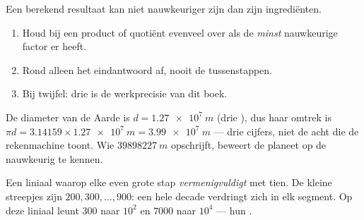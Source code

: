 \begin{method}\label{met:g10:orders-of-magnitude:sigfig}
Een berekend resultaat kan niet nauwkeuriger zijn dan zijn
ingrediënten.
\begin{enumerate}
  \item Houd bij een product of quotiënt evenveel 
        over als de \emph{minst} nauwkeurige factor er heeft.
  \item Rond alleen het eindantwoord af, nooit de tussenstappen.
  \item Bij twijfel: drie  is de werkprecisie van
        dit boek.
\end{enumerate}
\end{method}

\begin{example}\label{ex:g10:orders-of-magnitude:sigfig}
De diameter van de Aarde is $d = \qty{1.27e7}{m}$ (drie ), dus haar omtrek is
$\pi d = \num{3.14159} \times \qty{1.27e7}{m} = \qty{3.99e7}{m}$ ---
drie cijfers, niet de acht die de rekenmachine toont. Wie
$\qty{39898227}{m}$ opschrijft, beweert de planeet op de 
nauwkeurig te kennen.
\end{example}

\begin{omfigure}

{\small Een liniaal waarop elke even grote stap \emph{vermenigvuldigt}
met tien. De kleine streepjes zijn $200, 300, \dots, 900$: een hele
decade verdringt zich in elk segment. Op deze liniaal leunt $\num{300}$
naar $10^{2}$ en $\num{7000}$ naar $10^{4}$ --- hun .}
\end{omfigure}

